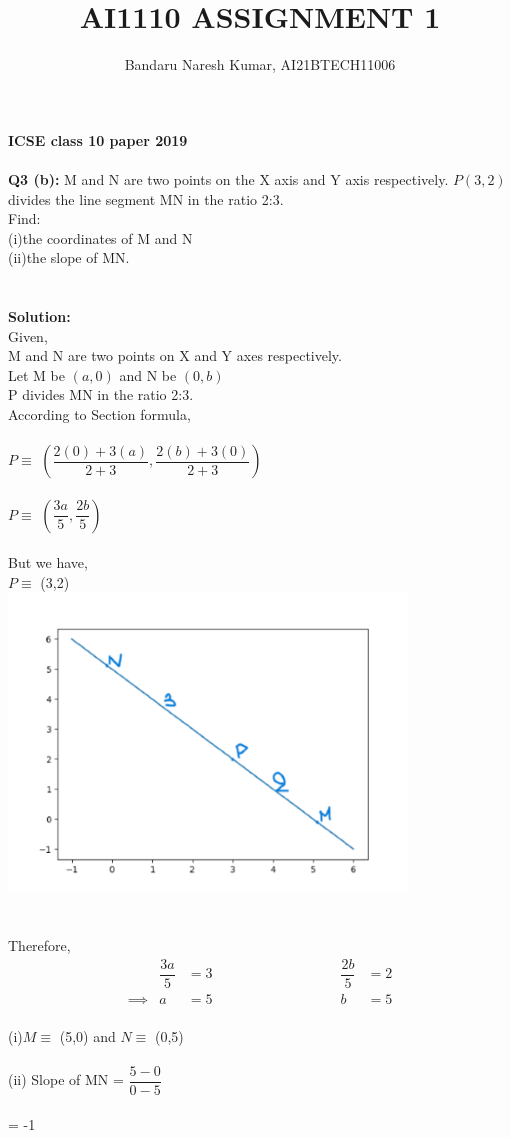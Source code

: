 \documentclass[journal,12pt,twocolumn]{IEEEtran}
\title{AI1110 ASSIGNMENT 1}
\author{Bandaru Naresh Kumar, AI21BTECH11006}
\begin{document}
\maketitle
\textbf{ICSE class 10 paper 2019}\\\\
\textbf{Q3 (b):}
M and N are two points on the X axis and Y axis respectively.
$P\left( 3,2\right)$ divides the line segment MN in the ratio 2:3.\\
Find:\\
 (i)the coordinates of M and N\\
 (ii)the slope of MN.\\\\
\\\textbf{Solution:}\\
Given,\\
\hspace*{10pt}M and N are two points on X and Y axes respectively.\\
\hspace*{10pt}Let M be $\left( a,0\right)$ and N be $\left( 0,b\right)$ \\
\hspace*{10pt}P divides MN in the ratio 2:3.\\
According to Section formula,\\\\
\hspace*{10pt}$P \equiv$ $\left(\dfrac{2(0)+3(a)}{2+3},\dfrac{2(b)+3(0)}{2+3}\right) $\\\\
\hspace*{10pt}$P \equiv$ $\left( \dfrac{3a}{5},\dfrac{2b}{5}\right) $\\\\
But we have,\\
\hspace*{10pt}$P \equiv$ (3,2)\\ 
\includegraphics[scale=1]{figures/Figure_1.png}\\\\\\
Therefore,\\
\begin{align}
  &\dfrac{3a}{5} &= 3 \hspace{100pt} &\dfrac{2b}{5} &= 2 \\
 \implies &a &= 5 \hspace{100pt} &b &= 5
\end{align}\\ 
(i)$M \equiv$ (5,0) and $N \equiv$ (0,5)\\\\
(ii) Slope of MN = $\dfrac{5-0}{0-5}$\\\\
     \hspace*{85pt} = -1
\end{document}

